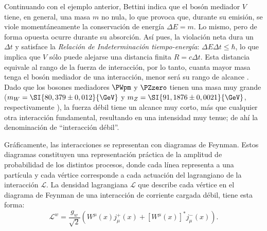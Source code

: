 Continuando con el ejemplo anterior, Bettini indica que el bosón mediador $V$ tiene, en general, una masa $m$ no nula, lo que provoca que, durante su emisión, se viole momentáneamente la conservación de energía $\Delta E = m$. Lo mismo, pero de forma opuesta ocurre durante su absorción. Así pues, la violación neta dura un $\Delta t$ y satisface la \textit{Relación de Indeterminación tiempo-energía}: $\Delta E \Delta t \leq \hbar$, lo que implica que $V$ sólo puede alejarse una distancia finita $R=c\Delta t$. Esta distancia equivale al rango de la fuerza de interacción, por lo tanto, cuanta mayor masa tenga el bosón mediador de una interacción, menor será su rango de alcance \cite{Bettini}. Dado que los bosones mediadores $\PWpm$ y $\PZzero$ tienen una masa muy grande ($m_W = \SI{80,379 \pm 0,012}{\GeV}$ y $m_Z = \SI{91,1876 \pm 0,0021}{\GeV}$, respectivamente \cite{Zyla}), la fuerza débil tiene un alcance muy corto, más que cualquier otra interacción fundamental, resultando en una intensidad muy tenue; de ahí la denominación de ``interacción débil''. 

Gráficamente, las interacciones se representan con diagramas de Feynman. Estos diagramas constituyen una representación práctica de la amplitud de probabilidad de los distintos procesos, donde cada línea representa a una partícula y cada vértice corresponde a cada actuación del lagrangiano de la interacción $\mathcal{L}$. La densidad lagrangiana $\mathcal{L}$ que describe cada vértice en el diagrama de Feynman de una interacción de corriente cargada débil, tiene esta forma:
\begin{equation}
\mathcal{L}^{w}=\dfrac{g_{w}}{\sqrt{2}}\left( W^{\mu }\left( x\right) j_{\mu}^{+}\left( x\right) +\left[ W^{\mu }\left( x\right) \right]^{\ast }j_{\mu}^{-}\left( x\right) \right) .\label{eq:weak_lagrangian}
\end{equation}

